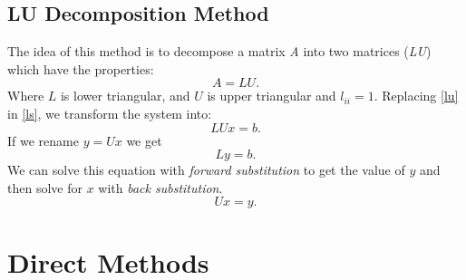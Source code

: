 \documentclass[12pt]{report}
\begin{document}
\subsection*{LU Decomposition Method}
The idea of this method is to decompose a matrix \emph{A} into two matrices (\emph{LU}) which have the properties:
\begin{equation}\label{lu}
 A=LU.
\end{equation}
Where $L$ is lower triangular, and $U$ is upper triangular and $l_{ii}=1$.
Replacing \eqref{lu} in \eqref{ls}, we transform the system into:
\begin{equation*}
 LUx=b.
\end{equation*}
If we rename $y=Ux$ we get
\begin{equation*}
 Ly=b.
\end{equation*}
We can solve this equation with \emph{forward substitution} to get the value of $y$ and then solve for $x$ with \emph{back substitution}.
\begin{equation*}
 Ux=y.
\end{equation*}

\section{Direct Methods}
\end{document}
